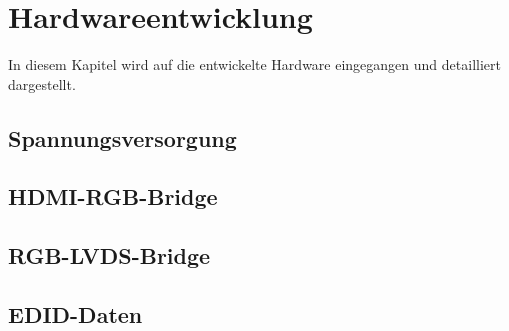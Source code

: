 \section{Hardwareentwicklung}
\label{sec:TeilB_Hardware}
In diesem Kapitel wird auf die entwickelte Hardware eingegangen und detailliert dargestellt. 
\subsection{Spannungsversorgung}
\subsection{HDMI-RGB-Bridge}
\subsection{RGB-LVDS-Bridge}
\subsection{EDID-Daten}

